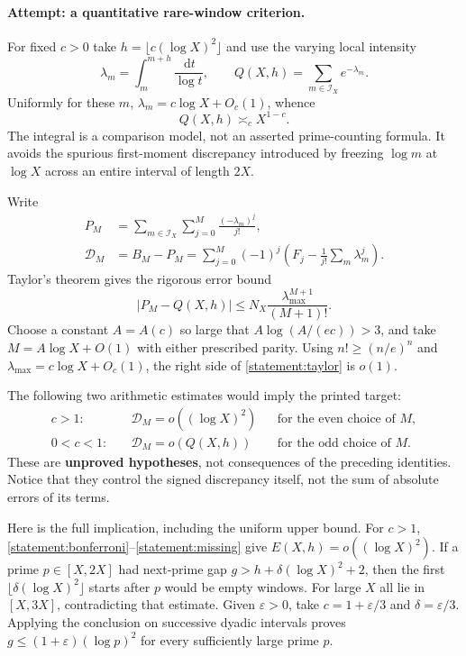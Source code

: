 \documentclass[11pt,a4paper]{article}
\newcommand{\dd}{\,\mathrm d}
\numberwithin{equation}{section}
\begin{document}
\paragraph{Attempt: a quantitative rare-window criterion.}
For fixed $c>0$ take $h=\lfloor c(\log X)^2\rfloor$ and use the varying
local intensity
\[
 \lambda_m=\int_m^{m+h}\frac{\dd t}{\log t},\qquad
 Q(X,h)=\sum_{m\in\mathcal I_X}e^{-\lambda_m}.
\]
Uniformly for these $m$,
$\lambda_m=c\log X+O_c(1)$, whence
\begin{equation}\label{statement:poisson-scale}
 Q(X,h)\asymp_c X^{1-c}.
\end{equation}
The integral is a comparison model, not an asserted prime-counting formula.
It avoids the spurious first-moment discrepancy introduced by freezing
$\log m$ at $\log X$ across an entire interval of length $2X$.

Write
\begin{align}
 P_M&=\sum_{m\in\mathcal I_X}\sum_{j=0}^M
             \frac{(-\lambda_m)^j}{j!},\\
 \mathcal D_M&=B_M-P_M
 =\sum_{j=0}^M(-1)^j
   \left(F_j-\frac1{j!}\sum_m\lambda_m^j\right).
 \label{statement:signed-discrepancy}
\end{align}
Taylor's theorem gives the rigorous error bound
\begin{equation}\label{statement:taylor}
 |P_M-Q(X,h)|\le
 N_X\frac{\lambda_{\max}^{M+1}}{(M+1)!}.
\end{equation}
Choose a constant $A=A(c)$ so large that
$A\log(A/(ec))>3$, and take $M=A\log X+O(1)$ with either prescribed
parity. Using $n!\ge(n/e)^n$ and
$\lambda_{\max}=c\log X+O_c(1)$, the right side of
\eqref{statement:taylor} is $o(1)$.

The following two arithmetic estimates would imply the printed target:
\begin{equation}\label{statement:missing}
 \begin{aligned}
 c>1:&\quad \mathcal D_M=o((\log X)^2)
       &&\text{for the even choice of }M,\\
 0<c<1:&\quad \mathcal D_M=o(Q(X,h))
       &&\text{for the odd choice of }M.
 \end{aligned}
\end{equation}
These are \textbf{unproved hypotheses}, not consequences of the preceding
identities. Notice that they control the signed discrepancy itself, not
the sum of absolute errors of its terms.

Here is the full implication, including the uniform upper bound. For
$c>1$, \eqref{statement:bonferroni}--\eqref{statement:missing} give
$E(X,h)=o((\log X)^2)$. If a prime $p\in[X,2X]$ had next-prime gap
$g>h+\delta(\log X)^2+2$, then the first
$\lfloor\delta(\log X)^2\rfloor$ starts after $p$ would be empty windows.
For large $X$ all lie in $[X,3X]$, contradicting that estimate. Given
$\varepsilon>0$, take $c=1+\varepsilon/3$ and
$\delta=\varepsilon/3$. Applying the conclusion on successive dyadic
intervals proves $g\le(1+\varepsilon)(\log p)^2$ for every sufficiently
large prime $p$.
\end{document}
